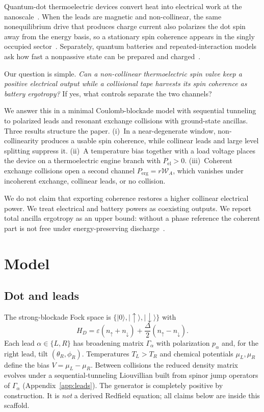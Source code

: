 \documentclass[aps,pre,twocolumn,floatfix,groupedaddress,amsmath,amssymb,nofootinbib]{revtex4-2}
\newcommand{\ket}[1]{\lvert #1\rangle}
\newcommand{\W}{\mathcal{W}}
\begin{document}
Quantum-dot thermoelectric devices convert heat into electrical work at the
nanoscale~\cite{Sothmann2015,Benenti2017,Whitney2014,Josefsson2018}. When the
leads are magnetic and non-collinear, the same nonequilibrium drive that
produces charge current also polarizes the dot spin away from the energy
basis, so a stationary spin coherence appears in the singly occupied
sector~\cite{Splettstoesser2010}. Separately, quantum batteries and
repeated-interaction models ask how fast a nonpassive state can be prepared
and charged~\cite{Allahverdyan2004,AlickiFannes2013,Campaioli2017,Francica2020,Bettmann2023,CollisionalTransmon2025}.

Our question is simple. \emph{Can a non-collinear thermoelectric spin valve
keep a positive electrical output while a collisional tape harvests its spin
coherence as battery ergotropy?} If yes, what controls separate the two
channels?

We answer this in a minimal Coulomb-blockade model with sequential tunneling
to polarized leads and resonant exchange collisions with ground-state
ancillas. Three results structure the paper. (i)~In a near-degenerate
window, non-collinearity produces a usable spin coherence, while collinear
leads and large level splitting suppress it. (ii)~A temperature bias together
with a load voltage places the device on a thermoelectric engine branch with
$P_{\mathrm{el}}>0$. (iii)~Coherent exchange collisions open a second channel
$P_{\mathrm{erg}}=r\W_A$, which vanishes under incoherent exchange, collinear
leads, or no collision.

We do not claim that exporting coherence restores a higher collinear
electrical power. We treat electrical and battery powers as coexisting
outputs. We report total ancilla ergotropy as an upper bound: without a
phase reference the coherent part is not free under energy-preserving
discharge~\cite{Lostaglio2015,Francica2020}.

\section{Model}

\subsection{Dot and leads}

The strong-blockade Fock space is
$\{\ket{0},\ket{\uparrow},\ket{\downarrow}\}$ with
\begin{equation}
H_D=\varepsilon(n_\uparrow+n_\downarrow)+\frac{\Delta}{2}(n_\uparrow-n_\downarrow).
\end{equation}
Each lead $\alpha\in\{L,R\}$ has broadening matrix $\Gamma_\alpha$ with
polarization $p_\alpha$ and, for the right lead, tilt $(\theta_R,\phi_R)$.
Temperatures $T_L>T_R$ and chemical potentials $\mu_L,\mu_R$ define the bias
$V=\mu_L-\mu_R$. Between collisions the reduced density matrix evolves under
a sequential-tunneling Liouvillian built from spinor jump operators of
$\Gamma_\alpha$ (Appendix~\ref{app:leads}). The generator is completely
positive by construction. It is \emph{not} a derived Redfield equation; all
claims below are inside this scaffold.
\end{document}
